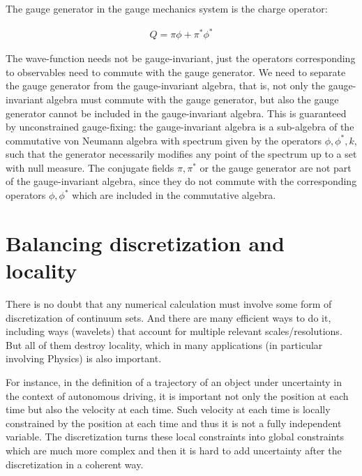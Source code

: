 \documentclass[11pt]{book}
\begin{document}
The gauge generator in the gauge mechanics system is the charge
operator:

\begin{equation}\begin{aligned}
    Q=\pi\phi+\pi^*\phi^*
\end{aligned}\end{equation}

The wave-function needs not be gauge-invariant, just the operators
corresponding to observables need to commute with the gauge generator.
We need to separate the gauge generator from the gauge-invariant
algebra, that is, not only the gauge-invariant algebra must commute with
the gauge generator, but also the gauge generator cannot be included in
the gauge-invariant algebra. This is guaranteed by unconstrained
gauge-fixing: the gauge-invariant algebra is a sub-algebra of the
commutative von Neumann algebra with spectrum given by the operators
\(\phi,\phi^*,k\), such that the generator necessarily modifies any
point of the spectrum up to a set with null measure. The conjugate
fields \(\pi,\pi^*\) or the gauge generator are not part of the
gauge-invariant algebra, since they do not commute with the
corresponding operators \(\phi,\phi^*\) which are included in the
commutative algebra.

\hypertarget{balancing-discretization-and-locality}{%
\section{Balancing discretization and
locality}\label{balancing-discretization-and-locality}}

There is no doubt that any numerical calculation must involve some form
of discretization of continuum sets. And there are many efficient ways
to do it, including ways (wavelets) that account for multiple relevant
scales/resolutions. But all of them destroy locality, which in many
applications (in particular involving Physics) is also
important\cite{paramanifold}.

For instance, in the definition of a trajectory of an object under
uncertainty in the context of autonomous driving, it is important not
only the position at each time but also the velocity at each time. Such
velocity at each time is locally constrained by the position at each
time and thus it is not a fully independent variable. The discretization
turns these local constraints into global constraints which are much
more complex\cite{paramanifold} and then
it is hard to add uncertainty after the discretization in a coherent
way\cite{article}.
\end{document}
